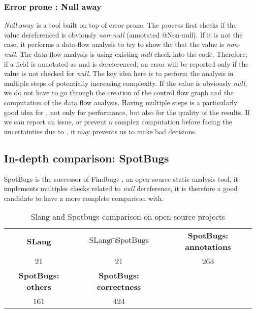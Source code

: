 \subsubsection{Error prone : Null away}
\label{subsubsec:error_prone}

\emph{Null} away is a tool built on top of error prone. 
The process first checks if the value dereferenced is obviously \emph{non-null} (annotated @Non-null). If it is not the case, it performs a data-flow analysis to try to show the that the value is \emph{non-null}. 
The data-flow analysis is using existing \emph{null} check into the code. 
Therefore, if a field is annotated as \nullable{} and is dereferenced, an error will be reported only if the value is not checked for \emph{null}. 
The key idea here is to perform the analysis in multiple steps of potentially increasing complexity. 
If the value is obviously \emph{null}, we do not have to go through the creation of the control flow graph and the computation of the data flow analysis. 
Having multiple steps is a particularly good idea for \slang{}, not only for performance, but also for the quality of the results. 
If we can report an issue, or prevent a complex computation before facing the uncertainties due to \slang{}, it may prevents us to make bad decisions.

\subsection{In-depth comparison: SpotBugs}
\label{subsec:indpeth_comparison_spotbugs}

SpotBugs \cite{Spotbugs:2019:Online} is the successor of Findbugs \cite{FindBugs:2019:Online}, an open-source static analysis tool, it implements multiples checks related to \emph{null} dereference, it is therefore a good candidate to have a more complete comparison with.

\begin{table}[h]
	\centering
	\caption{Slang and Spotbugs comparison on open-source projects}
	\label{table:slang_vs_spotbugs}
	\begin{tabular}{|c|c|c|}
		\hline
		\bf SLang & \bf $\text{SLang} \cap \text{SpotBugs}$ & \bf SpotBugs: annotations \\
		21 & 21 & 263 \\ \hline
		\bf SpotBugs: others & \bf SpotBugs: correctness & \\ 
		161 & 424 &  \\ \hline
	\end{tabular}
\end{table}

